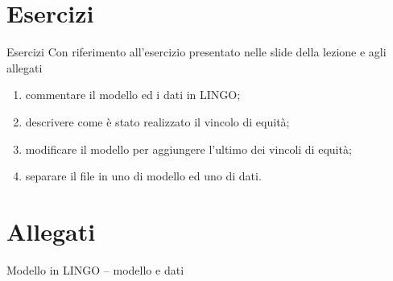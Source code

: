 \documentclass{beamer}
\begin{document}
\generatitolo

\section{Esercizi}

\begin{frame}
{Esercizi}
Con riferimento all'esercizio presentato nelle slide della lezione e agli allegati

\begin{enumerate}
 \item commentare il modello ed i dati in LINGO;
 \item descrivere come \`e stato realizzato il vincolo di equit\`a;
 \item modificare il modello per aggiungere l'ultimo dei vincoli di
	equit\`a;
 \item separare il file in uno di modello ed uno di dati.
\end{enumerate}

\end{frame}

\section{Allegati}


\begin{frame}[allowframebreaks]{Modello in LINGO -- modello e dati}

\end{frame}
\end{document}
